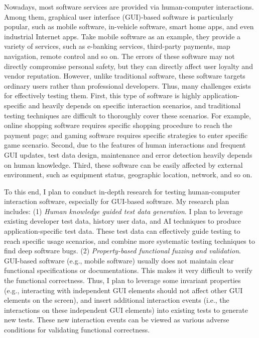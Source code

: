 \documentclass[a4paper]{article}
\begin{document}
Nowadays, most software services are provided via human-computer interactions. Among them, graphical user interface (GUI)-based software is particularly popular, such as mobile software, in-vehicle software, smart home apps, and even industrial Internet apps. Take mobile software as an example, they provide a variety of services, such as e-banking services, third-party payments, map navigation, remote control and so on. The errors of these software may not directly compromise personal safety, but they can directly affect user loyalty and vendor reputation. However, unlike traditional software, these software targets ordinary users rather than professional developers. Thus, many challenges exists for effectively testing them. First, this type of software is highly application-specific and heavily depends on specific interaction scenarios, and traditional testing techniques are difficult to thoroughly cover these scenarios. For example, online shopping software requires specific shopping procedure to reach the payment page; and gaming software requires specific strategies to enter specific game scenario. 
Second, due to the features of human interactions and frequent GUI updates, test data design, maintenance and error detection heavily depends on human knowledge.
Third, these software can be easily affected by external environment, such as equipment status, geographic location, network, and so on.

To this end, I plan to conduct in-depth research for testing human-computer interaction software, especially for GUI-based software. My research plan includes: 
(1) \emph{Human knowledge guided test data generation}.
I plan to leverage existing developer test data, history user data, and AI techniques to produce application-specific test data. 
These test data can effectively guide testing to reach specific usage scenarios, and combine more systematic testing techniques to find deep software bugs.
(2) \emph{Property-based functional fuzzing and validation}.
GUI-based software (e.g., mobile software) usually does not maintain clear functional specifications or documentations. 
This makes it very difficult to verify the functional correctness.
Thus, I plan to leverage some invariant properties (e.g., interacting with independent GUI elements should not affect other GUI elements on the screen), and insert additional interaction events (i.e., the interactions on these independent GUI elements) into existing tests to generate new tests. These new interaction events can be viewed as various adverse conditions for validating functional correctness.
\end{document}
